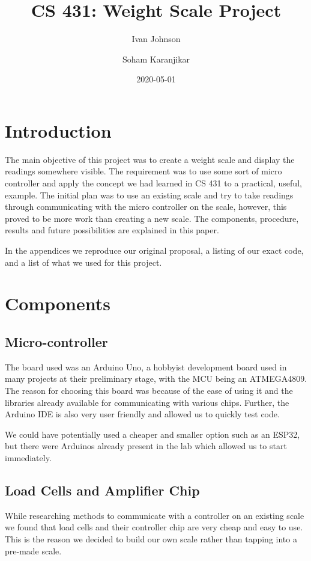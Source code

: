 \documentclass[letterpaper,11pt]{article}
\title{CS 431: Weight Scale Project}
\author{Ivan Johnson \and Soham Karanjikar}
\date{2020-05-01}
\begin{document}
\maketitle

\newpage
\section{Introduction}
The main objective of this project was to create a weight scale and display the
readings somewhere visible. The requirement was to use some sort of micro
controller and apply the concept we had learned in CS 431 to a practical,
useful, example. The initial plan was to use an existing scale and try to take
readings through communicating with the micro controller on the scale, however,
this proved to be more work than creating a new scale. The components,
procedure, results and future possibilities are explained in this paper.

In the appendices we reproduce our original proposal, a listing of our exact
code, and a list of what we used for this project.

\section{Components}
\subsection{Micro-controller}
The board used was an Arduino Uno, a hobbyist development board used in many
projects at their preliminary stage, with the MCU being an ATMEGA4809. The
reason for choosing this board was because of the ease of using it and the
libraries already available for communicating with various chips. Further, the
Arduino IDE is also very user friendly and allowed us to quickly test code.

We could have potentially used a cheaper and smaller option such as an ESP32,
but there were Arduinos already present in the lab which allowed us to start
immediately.

\subsection{Load Cells and Amplifier Chip}
While researching methods to communicate with a controller on an existing scale
we found that load cells and their controller chip are very cheap and easy to
use. This is the reason we decided to build our own scale rather than tapping
into a pre-made scale.
\end{document}
